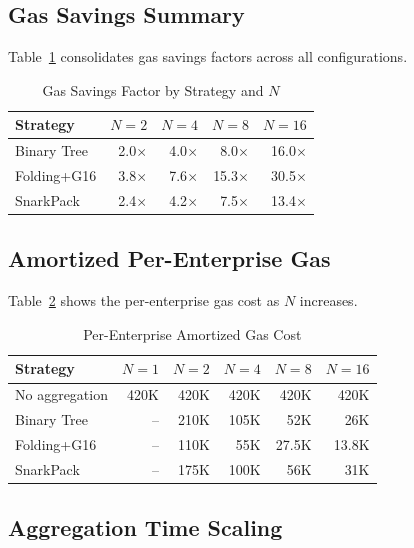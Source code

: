 \subsection{Gas Savings Summary}

Table~\ref{tab:gas-savings} consolidates gas savings factors across all
configurations.

\begin{table}[htbp]
\centering
\caption{Gas Savings Factor by Strategy and $N$}
\label{tab:gas-savings}
\begin{tabular}{@{}lrrrr@{}}
\toprule
\textbf{Strategy} & $N{=}2$ & $N{=}4$ & $N{=}8$ & $N{=}16$ \\
\midrule
Binary Tree    & 2.0$\times$ & 4.0$\times$ & 8.0$\times$ & 16.0$\times$ \\
Folding+G16    & 3.8$\times$ & 7.6$\times$ & 15.3$\times$ & 30.5$\times$ \\
SnarkPack      & 2.4$\times$ & 4.2$\times$ & 7.5$\times$ & 13.4$\times$ \\
\bottomrule
\end{tabular}
\end{table}

\subsection{Amortized Per-Enterprise Gas}

Table~\ref{tab:amortized} shows the per-enterprise gas cost as $N$
increases.

\begin{table}[htbp]
\centering
\caption{Per-Enterprise Amortized Gas Cost}
\label{tab:amortized}
\begin{tabular}{@{}lrrrrr@{}}
\toprule
\textbf{Strategy} & $N{=}1$ & $N{=}2$ & $N{=}4$ & $N{=}8$ & $N{=}16$ \\
\midrule
No aggregation  & 420K & 420K & 420K & 420K  & 420K \\
Binary Tree     & --   & 210K & 105K & 52K   & 26K \\
Folding+G16     & --   & 110K & 55K  & 27.5K & 13.8K \\
SnarkPack       & --   & 175K & 100K & 56K   & 31K \\
\bottomrule
\end{tabular}
\end{table}

\subsection{Aggregation Time Scaling}

